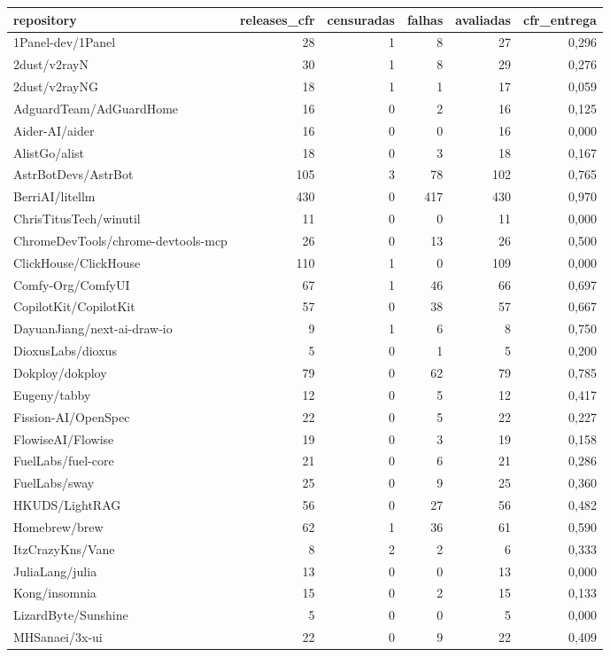 \begin{tabular}{lrrrrr}
\hline
repository & releases\_cfr & censuradas & falhas & avaliadas & cfr\_entrega \\
\hline
1Panel-dev/1Panel & 28 & 1 & 8 & 27 & 0,296 \\
2dust/v2rayN & 30 & 1 & 8 & 29 & 0,276 \\
2dust/v2rayNG & 18 & 1 & 1 & 17 & 0,059 \\
AdguardTeam/AdGuardHome & 16 & 0 & 2 & 16 & 0,125 \\
Aider-AI/aider & 16 & 0 & 0 & 16 & 0,000 \\
AlistGo/alist & 18 & 0 & 3 & 18 & 0,167 \\
AstrBotDevs/AstrBot & 105 & 3 & 78 & 102 & 0,765 \\
BerriAI/litellm & 430 & 0 & 417 & 430 & 0,970 \\
ChrisTitusTech/winutil & 11 & 0 & 0 & 11 & 0,000 \\
ChromeDevTools/chrome-devtools-mcp & 26 & 0 & 13 & 26 & 0,500 \\
ClickHouse/ClickHouse & 110 & 1 & 0 & 109 & 0,000 \\
Comfy-Org/ComfyUI & 67 & 1 & 46 & 66 & 0,697 \\
CopilotKit/CopilotKit & 57 & 0 & 38 & 57 & 0,667 \\
DayuanJiang/next-ai-draw-io & 9 & 1 & 6 & 8 & 0,750 \\
DioxusLabs/dioxus & 5 & 0 & 1 & 5 & 0,200 \\
Dokploy/dokploy & 79 & 0 & 62 & 79 & 0,785 \\
Eugeny/tabby & 12 & 0 & 5 & 12 & 0,417 \\
Fission-AI/OpenSpec & 22 & 0 & 5 & 22 & 0,227 \\
FlowiseAI/Flowise & 19 & 0 & 3 & 19 & 0,158 \\
FuelLabs/fuel-core & 21 & 0 & 6 & 21 & 0,286 \\
FuelLabs/sway & 25 & 0 & 9 & 25 & 0,360 \\
HKUDS/LightRAG & 56 & 0 & 27 & 56 & 0,482 \\
Homebrew/brew & 62 & 1 & 36 & 61 & 0,590 \\
ItzCrazyKns/Vane & 8 & 2 & 2 & 6 & 0,333 \\
JuliaLang/julia & 13 & 0 & 0 & 13 & 0,000 \\
Kong/insomnia & 15 & 0 & 2 & 15 & 0,133 \\
LizardByte/Sunshine & 5 & 0 & 0 & 5 & 0,000 \\
MHSanaei/3x-ui & 22 & 0 & 9 & 22 & 0,409 \\

\end{tabular}
